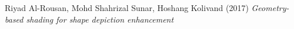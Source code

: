 \begin{thebibliography}{9}
	Riyad Al-Rousan, Mohd Shahrizal Sunar, Hoshang Kolivand (2017) \emph{Geometry-based shading for shape depiction enhancement}
\end{thebibliography}